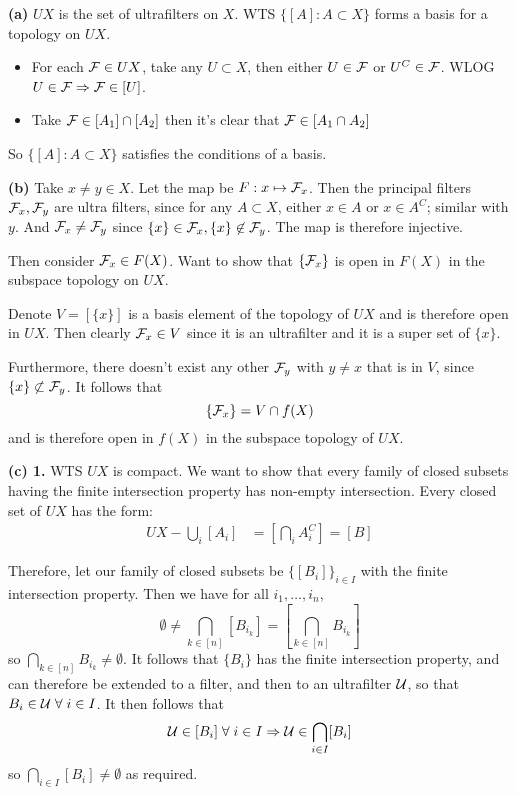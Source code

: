 \documentclass[a4paper, 10pt]{article}
\begin{document}
\begin{solution}
    \textbf{(a)} $UX$ is the set of ultrafilters on $X$. WTS $\{[A] : A \subset X\}$ forms a basis for a topology on $UX$.

    \begin{itemize}
        \item For each $\mathcal{F} \in UX$, take any $U \subset X$, then either $U \in \mathcal{F}$ or $U^C \in \mathcal{F}$. WLOG $U \in \mathcal{F} \Rightarrow \mathcal{F} \in [U]$.
        \item Take $\mathcal{F} \in [A_1] \cap [A_2]$ then it's clear that $\mathcal{F} \in [A_1 \cap A_2]$
    \end{itemize}
    So $\{[A] : A \subset X\}$ satisfies the conditions of a basis.

    \textbf{(b)} Take $x \neq y \in X$. Let the map be $F: x \mapsto \mathcal{F}_x$. Then the principal filters $\mathcal{F}_x, \mathcal{F}_y$ are ultra filters, since for any $A \subset X$, either $x \in A$ or $x \in A^C$; similar with $y$. And $\mathcal{F}_x \neq \mathcal{F}_y$ since $\{x\} \in \mathcal{F}_x, \{x\} \not \in \mathcal{F}_y$. The map is therefore injective.

    Then consider $\mathcal{F}_x \in F(X)$. Want to show that $\{\mathcal{F}_x\}$ is open in $F(X)$ in the subspace topology on $UX$.

    Denote $V = [\{x\}]$ is a basis element of the topology of $UX$ and is therefore open in $UX$. Then clearly $\mathcal{F}_x \in V$ since it is an ultrafilter and it is a super set of $\{x\}$.

    Furthermore, there doesn't exist any other $\mathcal{F}_y$ with $y \neq x$ that is in $V$, since $\{x \} \not \subset \mathcal{F}_y$. It follows that \begin{equation*}
    \{\mathcal{F}_x\} = V \cap f(X)
    \end{equation*}
    and is therefore open in $f(X)$ in the subspace topology of $UX$.

    \textbf{(c) 1.} WTS $UX$ is compact. We want to show that every family of closed subsets having the finite intersection property has non-empty intersection. Every closed set of $UX$ has the form:
    \begin{align*}
        UX - \bigcup_i [A_i] &= [\bigcap_i A_i^C] = [B]
    \end{align*}

    Therefore, let our family of closed subsets be $\{[B_i]\}_{i \in I}$ with the finite intersection property. Then we have for all $i_1, \ldots, i_n$, \begin{equation*}
    \emptyset \neq \bigcap_{k \in [n]} [B_{i_k}] = [\bigcap_{k \in [n]} B_{i_k}]
    \end{equation*}
    so $\bigcap_{k \in [n]} B_{i_k} \neq \emptyset$. It follows that $\{B_i\}$ has the finite intersection property, and can therefore be extended to a filter, and then to an ultrafilter $\mathcal{U}$, so that $B_i \in \calu \forall i \in I$. It then follows that \begin{equation*}
    \calu \in [B_i] \forall i \in I \implies \calu \in \bigcap_{i \in I} [B_i]
    \end{equation*}
    so $\bigcap_{i \in I} [B_i] \neq \emptyset$ as required.


\end{solution}
\end{document}
